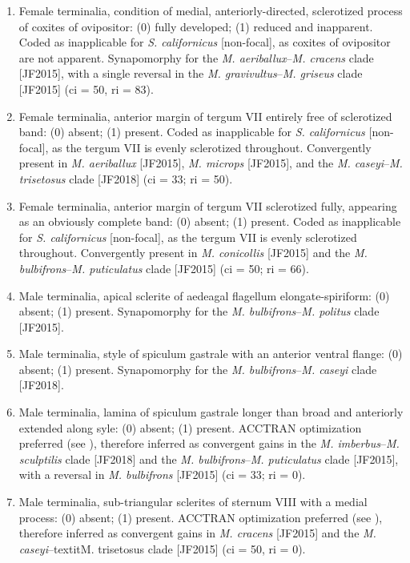 \documentclass[fleqn,10pt,lineno]{wlpeerj} %
\begin{document}
\begin{enumerate}
		\item Female terminalia, condition of medial, anteriorly-directed, sclerotized process of coxites of ovipositor: (0) fully developed; (1) reduced and inapparent. Coded as inapplicable for \textit{S. californicus} [non-focal], as coxites of ovipositor are not apparent. Synapomorphy for the \textit{M. aeriballux}--\textit{M. cracens} clade [JF2015], with a single reversal in the \textit{M. gravivultus}--\textit{M. griseus} clade [JF2015] (ci = 50, ri = 83).
		
		\item Female terminalia, anterior margin of tergum VII entirely free of sclerotized band: (0) absent; (1) present. Coded as inapplicable for \textit{S. californicus} [non-focal], as the tergum VII is evenly sclerotized throughout. Convergently present in \textit{M. aeriballux} [JF2015], \textit{M. microps} [JF2015], and the \textit{M. caseyi}--\textit{M. trisetosus} clade [JF2018] (ci = 33; ri = 50).
		
		\item Female terminalia, anterior margin of tergum VII sclerotized fully, appearing as an obviously complete band: (0) absent; (1) present. Coded as inapplicable for \textit{S. californicus} [non-focal], as the tergum VII is evenly sclerotized throughout. Convergently present in \textit{M. conicollis} [JF2015] and the \textit{M. bulbifrons}--\textit{M. puticulatus} clade [JF2015] (ci = 50; ri = 66).
		
		\item Male terminalia, apical sclerite of aedeagal flagellum elongate-spiriform: (0) absent; (1) present. Synapomorphy for the \textit{M. bulbifrons}--\textit{M. politus} clade [JF2015].
		
		\item Male terminalia, style of spiculum gastrale with an anterior ventral flange: (0) absent; (1) present. Synapomorphy for the \textit{M. bulbifrons}--\textit{M. caseyi} clade [JF2018].
		
		\item Male terminalia, lamina of spiculum gastrale longer than broad and anteriorly extended along syle: (0) absent; (1) present. ACCTRAN optimization preferred (see \citealt{agnarsson2008}), therefore inferred as convergent gains in the \textit{M. imberbus}--\textit{M. sculptilis} clade [JF2018] and the \textit{M. bulbifrons}--\textit{M. puticulatus} clade [JF2015], with a reversal in \textit{M. bulbifrons} [JF2015] (ci = 33; ri = 0).

		\item Male terminalia, sub-triangular sclerites of sternum VIII with a medial process: (0) absent; (1) present. ACCTRAN optimization preferred (see \citealt{agnarsson2008}), therefore inferred as convergent gains in \textit{M. cracens} [JF2015] and the \textit{M. caseyi}--textit{M. trisetosus} clade [JF2015] (ci = 50, ri = 0).
		

\end{enumerate}
\end{document}
